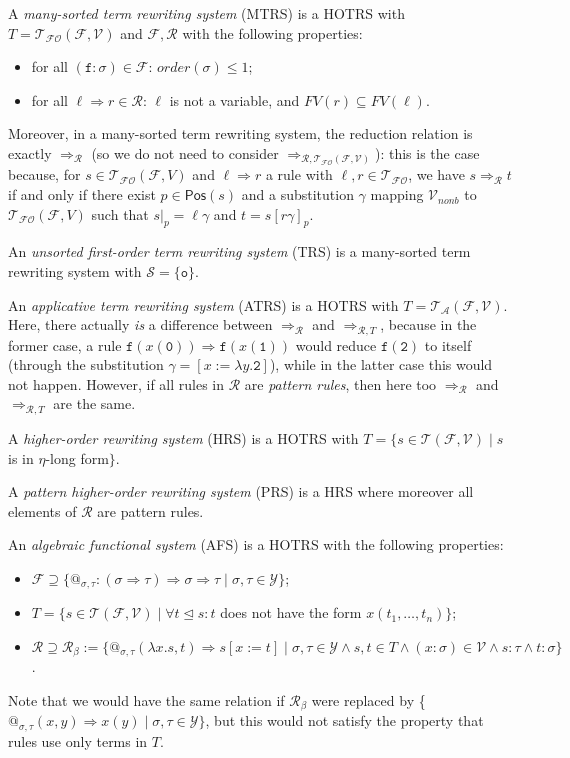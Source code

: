 \documentclass{lmcs}
\theoremstyle{theorem}\newtheorem{theorem}{Theorem}
\theoremstyle{theorem}\newtheorem{lemma}[theorem]{Lemma}
\theoremstyle{theorem}\newtheorem{corollary}[theorem]{Corollary}
\theoremstyle{definition}\newtheorem{definition}[theorem]{Definition}
\theoremstyle{definition}\newtheorem{example}[theorem]{Example}
\newcommand{\F}{\mathcal{F}}
\newcommand{\V}{\mathcal{V}}
\newcommand{\Vfree}{\mathcal{V}_{\mathit{nonb}}}
\newcommand{\Sorts}{\mathcal{S}}
\newcommand{\Types}{\mathcal{Y}}
\newcommand{\Terms}{\mathcal{T}}
\newcommand{\ATerms}{\mathcal{T}_{\mathcal{A}}}
\newcommand{\FOTerms}{\mathcal{T}_{\mathcal{FO}}}
\newcommand{\Rules}{\mathcal{R}}
\newcommand{\FV}{\mathit{FV}}
\newcommand{\Positions}{\mathsf{Pos}}
\newcommand{\order}{\mathit{order}}
\newcommand{\atype}{\sigma}
\newcommand{\identifier}[1]{\mathtt{#1}}
\newcommand{\afun}{\identifier{f}}
\newcommand{\avar}{x}
\newcommand{\bvar}{y}
\newcommand{\abs}[2]{\lambda #1.#2}
\newcommand{\arrtype}{\Rightarrow}
\newcommand{\arrz}{\Rightarrow}
\newcommand{\arr}[1]{\arrz_{#1}}
\newcommand{\subtermeq}{\unlhd}
\newcommand{\symb}[1]{\mathtt{#1}}
\newcommand{\nul}{\symb{0}}
\newcommand{\unitsort}{\mathtt{o}}
\begin{document}
A \emph{many-sorted term rewriting system} (MTRS) is a HOTRS with $T = \FOTerms(\F,\V)$ and
$\F,\Rules$ with the following properties:
\begin{itemize}
\item for all $(\afun : \atype) \in \F$: $\order(\atype) \leq 1$;
\item for all $\ell \arrz r \in \Rules$: $\ell$ is not a variable, and $\FV(r) \subseteq \FV(\ell)$.
\end{itemize}
Moreover, in a many-sorted term rewriting system, the reduction relation is exactly $\arr{\Rules}$
(so we do not need to consider $\arr{\Rules,\FOTerms(\F,\V)}$): this is the case because, for
$s \in \FOTerms(\F,V)$ and $\ell \arrz r$ a rule with $\ell,r \in \FOTerms$, we have
$s \arr{\Rules} t$ if and only if there exist $p \in \Positions(s)$ and a substitution $\gamma$
mapping $\Vfree$ to $\FOTerms(\F,V)$ such that $s|_p = \ell\gamma$ and $t = s[r\gamma]_p$.

An \emph{unsorted first-order term rewriting system} (TRS) is a many-sorted term rewriting system
with $\Sorts = \{ \unitsort \}$.

An \emph{applicative term rewriting system} (ATRS) is a HOTRS with $T = \ATerms(\F,\V)$.  Here,
there actually \emph{is} a difference between $\arr{\Rules}$ and $\arr{\Rules,T}$, because in the
former case, a rule $\afun(\avar(\nul)) \arrz \afun(\avar(\symb{1}))$ would reduce
$\afun(\symb{2})$ to itself (through the substitution $\gamma = [\avar:=\abs{\bvar}{\symb{2}}]$),
while in the latter case this would not happen.  However, if all rules in $\Rules$ are
\emph{pattern rules}, then here too $\arr{\Rules}$ and $\arr{\Rules,T}$ are the same.

A \emph{higher-order rewriting system} (HRS) is a HOTRS with $T = \{ s \in \Terms(\F,\V) \mid s$
is in $\eta$-long form$\}$.

A \emph{pattern higher-order rewriting system} (PRS) is a HRS where moreover all elements of
$\Rules$ are pattern rules.

An \emph{algebraic functional system} (AFS) is a HOTRS with the following properties:
\begin{itemize}
\item $\F \supseteq \{ @_{\sigma,\tau} : (\sigma \arrtype \tau) \arrtype \sigma \arrtype \tau
  \mid \sigma,\tau \in \Types \}$;
\item $T = \{ s \in \Terms(\F,\V) \mid \forall t \subtermeq s: t$ does not have the form
  $\avar(t_1,\dots,t_n)\}$;
\item $\Rules \supseteq \Rules_\beta := \{ @_{\sigma,\tau}(\abs{\avar}{s},t) \arrz s[\avar:=t] \mid
  \sigma,\tau \in \Types \wedge s,t \in T \wedge (\avar : \sigma) \in \V \wedge s : \tau \wedge
  t : \sigma \}$.
\end{itemize}
Note that we would have the same relation if $\Rules_\beta$ were replaced by \{
$@_{\sigma,\tau}(\avar,\bvar) \arrz \avar(\bvar) \mid \sigma,\tau \in \Types \}$, but this would not
satisfy the property that rules use only terms in $T$.
\end{document}
